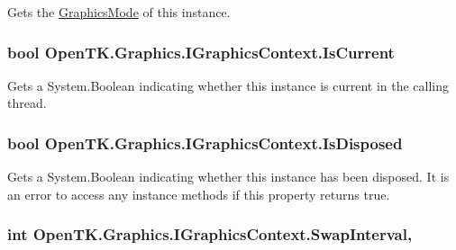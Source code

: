 Gets the \hyperlink{class_open_t_k_1_1_graphics_1_1_graphics_mode}{Graphics\-Mode} of this instance.

\hypertarget{interface_open_t_k_1_1_graphics_1_1_i_graphics_context_a1bf131a712f2a08f5f35e1542dccfb33}{
\subsubsection[{Is\-Current}]{\setlength{\rightskip}{0pt plus 5cm}bool Open\-T\-K.\-Graphics.\-I\-Graphics\-Context.\-Is\-Current\hspace{0.3cm}{\ttfamily [get]}}}\label{interface_open_t_k_1_1_graphics_1_1_i_graphics_context_a1bf131a712f2a08f5f35e1542dccfb33}


Gets a System.\-Boolean indicating whether this instance is current in the calling thread. 

\hypertarget{interface_open_t_k_1_1_graphics_1_1_i_graphics_context_af844efa5b99505bb659a892ec6200486}{
\subsubsection[{Is\-Disposed}]{\setlength{\rightskip}{0pt plus 5cm}bool Open\-T\-K.\-Graphics.\-I\-Graphics\-Context.\-Is\-Disposed\hspace{0.3cm}{\ttfamily [get]}}}\label{interface_open_t_k_1_1_graphics_1_1_i_graphics_context_af844efa5b99505bb659a892ec6200486}


Gets a System.\-Boolean indicating whether this instance has been disposed. It is an error to access any instance methods if this property returns true. 

\hypertarget{interface_open_t_k_1_1_graphics_1_1_i_graphics_context_acdd6cc5339e7d0d428f4aa59b560940f}{
\subsubsection[{Swap\-Interval}]{\setlength{\rightskip}{0pt plus 5cm}int Open\-T\-K.\-Graphics.\-I\-Graphics\-Context.\-Swap\-Interval\hspace{0.3cm}{\ttfamily [get]}, {\ttfamily [set]}}}\label{interface_open_t_k_1_1_graphics_1_1_i_graphics_context_acdd6cc5339e7d0d428f4aa59b560940f}



